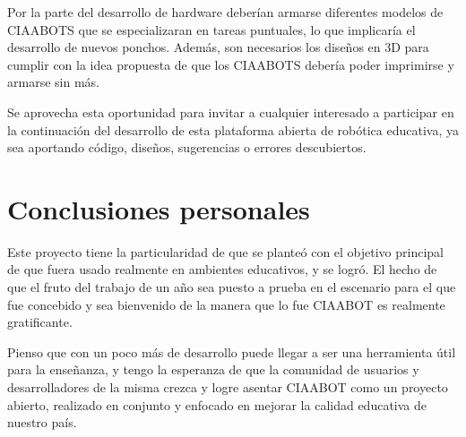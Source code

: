 Por la parte del desarrollo de hardware deberían armarse diferentes modelos de CIAABOTS que se especializaran en tareas puntuales, lo que implicaría el desarrollo de nuevos ponchos. Además, son necesarios los diseños en 3D para cumplir con la idea propuesta de que los CIAABOTS debería poder imprimirse y armarse sin más.

Se aprovecha esta oportunidad para invitar a cualquier interesado a participar en la continuación del desarrollo de esta plataforma abierta de robótica educativa, ya sea aportando código, diseños, sugerencias o errores descubiertos.

\section{Conclusiones personales}
Este proyecto tiene la particularidad de que se planteó con el objetivo principal de que fuera usado realmente en ambientes educativos, y se logró. El hecho de que el fruto del trabajo de un año sea puesto a prueba en el escenario para el que fue concebido y sea bienvenido de la manera que lo fue CIAABOT es realmente gratificante.

Pienso que con un poco más de desarrollo puede llegar a ser una herramienta útil para la enseñanza, y tengo la esperanza de que la comunidad de usuarios y desarrolladores de la misma crezca y logre asentar CIAABOT como un proyecto abierto, realizado en conjunto y enfocado en mejorar la calidad educativa de nuestro país.

